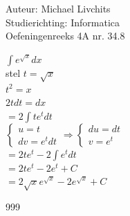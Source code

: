 \documentclass[a4paper]{article}
\begin{document}
  
\noindent \large Auteur: Michael Livchits \\
\noindent \large Studierichting: Informatica\\
\noindent \large Oefeningenreeks 4A nr. 34.8\\

\medskip

\normalsize

$\displaystyle\int e^{\sqrt{x}}dx$\\

stel $t = \sqrt{x}$\\

$t^2 = x$\\

$2tdt = dx$\\

$= 2\displaystyle\int te^tdt$\\

$\left\{
    \begin{array}{l}
        u =  t \\
        dv = e^tdt
    \end{array}
\right .
\Rightarrow
\left\{
    \begin{array}{l}
        du = dt \\
        v = e^t
    \end{array}
\right .$\\

$= 2te^t-2\displaystyle\int e^tdt$\\

$= 2te^t-2e^t + C$\\

$= 2\sqrt{x}e^{\sqrt{x}}-2e^{\sqrt{x}} + C$\\

\begin{thebibliography}{999}
\end{thebibliography}
\end{document}
